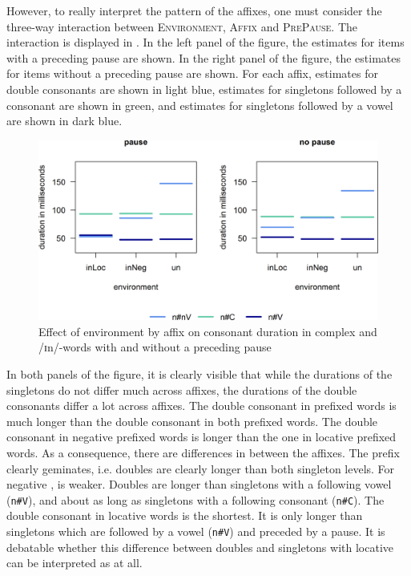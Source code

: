  However, to really interpret the  pattern of the affixes, one must consider the three-way interaction between \textsc{Environment}, \textsc{Affix} and \textsc{PrePause}. The interaction is displayed in . In the left panel of the figure, the estimates for items with a preceding pause are shown. In the right panel of the figure, the estimates for items without a preceding pause are shown. For each affix, estimates for double consonants are shown in light blue, estimates for singletons followed by a consonant are shown in green, and estimates for singletons followed by a vowel are shown in dark blue.


\begin{figure}[b]
	
	\includegraphics [scale=0.6] {images/Experiment/UnInInterEnvAffixPause1}
	
	\caption{Effect of environment by affix on consonant duration in complex  and /ɪn/-words with and without a preceding pause}
	\label{fig:Un In experiment}
\end{figure}\pagebreak


In both panels of the figure, it is clearly visible that while the durations of the singletons do not differ much across affixes, the durations of the double consonants differ a lot across affixes. The double consonant in prefixed words is much longer than the double consonant in both prefixed words.
The double consonant in negative prefixed words is longer than the one in locative prefixed words. 
As a consequence, there are differences in  between the affixes. 
 The prefix  clearly geminates, i.e. doubles are clearly longer than both singleton levels. 
For negative ,  is weaker. Doubles are longer than singletons with a following vowel (\texttt{n\#V}), and about as long as singletons with a following consonant (\texttt{n\#C}). 
The double consonant in locative words is the shortest. It is only longer than singletons which are followed by a vowel (\texttt{n\#V}) and preceded by a pause. It is debatable whether this difference between doubles and singletons with locative  can be interpreted as  at all.

